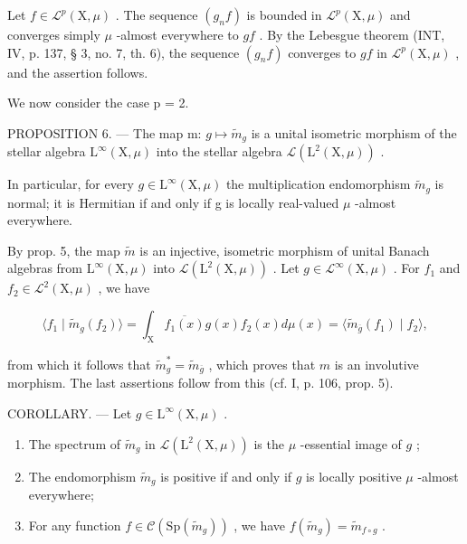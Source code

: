 Let \(f \in \mathcal{L}^p(\mathrm{X},\mu)\) . The sequence \((g_{n}f)\) is bounded in \(\mathcal{L}^p(\mathrm{X},\mu)\) and converges simply \(\mu\) -almost everywhere to \(gf\) . By the Lebesgue theorem (INT, IV, p. 137, § 3, no. 7, th. 6), the sequence \((g_{n}f)\) converges to \(gf\) in \(\mathcal{L}^p(\mathrm{X},\mu)\) , and the assertion follows.

We now consider the case p = 2.

PROPOSITION 6. --- The map m: \(g \mapsto \widetilde{m}_{g}\) is a unital isometric morphism of the stellar algebra \(\mathrm{L}^{\infty}(\mathrm{X}, \mu)\) into the stellar algebra \(\mathcal{L}(\mathrm{L}^{2}(\mathrm{X}, \mu))\) .

In particular, for every \(g \in \mathrm{L}^{\infty}(\mathrm{X}, \mu)\) the multiplication endomorphism \(\widetilde{m}_{g}\) is normal; it is Hermitian if and only if g is locally real-valued \(\mu\) -almost everywhere.

By prop. 5, the map \(\tilde{m}\) is an injective, isometric morphism of unital Banach algebras from \(\mathrm{L}^{\infty}(\mathrm{X},\mu)\) into \(\mathcal{L}(\mathrm{L}^{2}(\mathrm{X},\mu))\) . Let \(g\in \mathcal{L}^{\infty}(\mathrm{X},\mu)\) . For \(f_{1}\) and \(f_{2}\in \mathcal{L}^{2}(\mathrm{X},\mu)\) , we have

\[
\langle f _ {1} \mid \widetilde {m} _ {g} (f _ {2}) \rangle = \int_ {\mathrm{X}} \overline {{f _ {1} (x)}} g (x) f _ {2} (x) d \mu (x) = \langle \widetilde {m} _ {\overline {{g}}} (f _ {1}) \mid f _ {2} \rangle ,
\]

from which it follows that \(\widetilde{m}_g^* = \widetilde{m}_{\overline{g}}\) , which proves that \(m\) is an involutive morphism. The last assertions follow from this (cf. I, p. 106, prop. 5).

COROLLARY. --- Let \(g \in \mathrm{L}^{\infty}(\mathrm{X},\mu)\) .

\begin{enumerate}
\def\labelenumi{\alph{enumi})}
\item
  The spectrum of \(\widetilde{m}_g\) in \(\mathcal{L}(\mathrm{L}^2 (\mathrm{X},\mu))\) is the \(\mu\) -essential image of \(g\) ;
\item
  The endomorphism \(\widetilde{m}_g\) is positive if and only if \(g\) is locally positive \(\mu\) -almost everywhere;
\item
  For any function \(f \in \mathcal{C}(\mathrm{Sp}(\widetilde{m}_g))\) , we have \(f(\widetilde{m}_g) = \widetilde{m}_{f \circ g}\) .
\end{enumerate}

